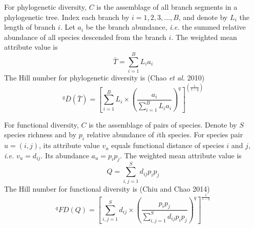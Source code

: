 \documentclass[11pt]{article}
\begin{document}
For phylogenetic diversity, $C$ is the assemblage of all branch segments in a phylogenetic tree. 
Index each branch by $i = 1,2,3,\dots,B$, and denote by $L_i$ the length of branch $i$. 
Let $a_i$ be the branch abundance, \textit{i.e.} the summed relative abundance of all species descended from the branch $i$. 
The weighted mean attribute value is 
\begin{equation}
    \bar{T} = \sum\limits_{i=1}^{B}L_ia_i
    \label{WeightedMeanAttributeValue_Phylogenetic}
\end{equation}
The Hill number for phylogenetic diversity is (Chao \textit{et al.} 2010)
\begin{equation}
    ^{q}\bar{D}(\bar{T}) = [\sum\limits_{i=1}^{B}L_i \times (\frac{a_i}{\sum\limits_{i=1}^{B}L_ia_i})^q]^{(\frac{1}{1-q})}
    \label{HillNumber_Phylogenetic}
\end{equation}

\newline

For functional diversity, $C$ is the assemblage of pairs of species. 
Denote by $S$ species richness and by $p_i$ relative abundance of $i$th species. 
For species pair $u=(i,j)$, its attribute value $v_u$ equals functional distance of species $i$ and $j$, \textit{i.e.} $v_u = d_{ij}$. 
Its abundance $a_u = p_ip_j$. 
The weighted mean attribute value is 
\begin{equation}
    Q = \sum\limits_{i,j=1}^{S}d_{ij}p_ip_j
    \label{WeightedMeanAttributeValue_Functional}
\end{equation}
The Hill number for functional diversity is (Chiu and Chao 2014)
\begin{equation}
    ^{q}FD(Q) = [\sum\limits_{i,j=1}^{S}d_{ij} \times (\frac{p_ip_j}{\sum\limits_{i,j=1}^{S}d_{ij}p_ip_j})^q]^{\frac{1}{1-q}}
\end{equation}
\end{document}
